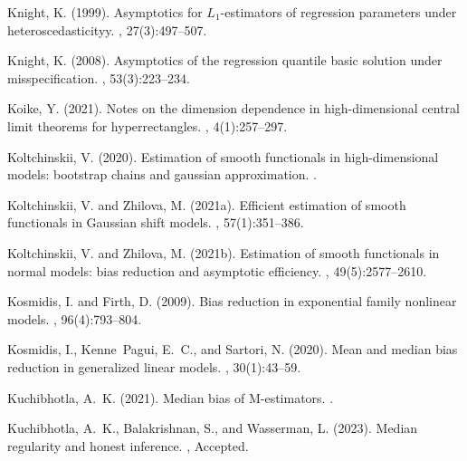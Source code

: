 \documentclass{article}
\numberwithin{myalgctr}{section}
\begin{document}
\begin{thebibliography}{}
Knight, K. (1999).
\newblock Asymptotics for ${L}_1$-estimators of regression parameters under
  heteroscedasticityy.
, 27(3):497--507.

Knight, K. (2008).
\newblock Asymptotics of the regression quantile basic solution under
  misspecification.
, 53(3):223--234.

Koike, Y. (2021).
\newblock Notes on the dimension dependence in high-dimensional central limit
  theorems for hyperrectangles.
, 4(1):257--297.

Koltchinskii, V. (2020).
\newblock Estimation of smooth functionals in high-dimensional models:
  bootstrap chains and gaussian approximation.
.

Koltchinskii, V. and Zhilova, M. (2021a).
\newblock Efficient estimation of smooth functionals in {G}aussian shift
  models.
, 57(1):351--386.

Koltchinskii, V. and Zhilova, M. (2021b).
\newblock Estimation of smooth functionals in normal models: bias reduction and
  asymptotic efficiency.
, 49(5):2577--2610.

Kosmidis, I. and Firth, D. (2009).
\newblock Bias reduction in exponential family nonlinear models.
, 96(4):793--804.

Kosmidis, I., Kenne~Pagui, E.~C., and Sartori, N. (2020).
\newblock Mean and median bias reduction in generalized linear models.
, 30(1):43--59.

Kuchibhotla, A.~K. (2021).
\newblock Median bias of {M}-estimators.
.

Kuchibhotla, A.~K., Balakrishnan, S., and Wasserman, L. (2023).
\newblock Median regularity and honest inference.
, Accepted.


\end{thebibliography}
\end{document}
